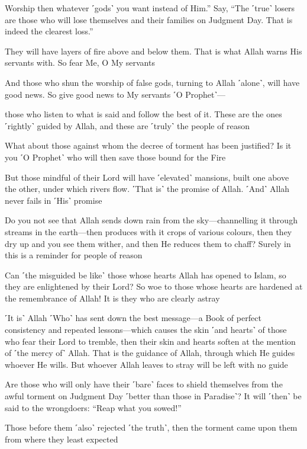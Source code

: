 Worship then whatever ˹gods˺ you want instead of Him.” Say, “The ˹true˺ losers are those who will lose themselves and their families on Judgment Day. That is indeed the clearest loss.”

They will have layers of fire above and below them. That is what Allah warns His servants with. So fear Me, O My servants

And those who shun the worship of false gods, turning to Allah ˹alone˺, will have good news. So give good news to My servants ˹O Prophet˺—

those who listen to what is said and follow the best of it. These are the ones ˹rightly˺ guided by Allah, and these are ˹truly˺ the people of reason

What about those against whom the decree of torment has been justified? Is it you ˹O Prophet˺ who will then save those bound for the Fire

But those mindful of their Lord will have ˹elevated˺ mansions, built one above the other, under which rivers flow. ˹That is˺ the promise of Allah. ˹And˺ Allah never fails in ˹His˺ promise

Do you not see that Allah sends down rain from the sky—channelling it through streams in the earth—then produces with it crops of various colours, then they dry up and you see them wither, and then He reduces them to chaff? Surely in this is a reminder for people of reason

Can ˹the misguided be like˺ those whose hearts Allah has opened to Islam, so they are enlightened by their Lord? So woe to those whose hearts are hardened at the remembrance of Allah! It is they who are clearly astray

˹It is˺ Allah ˹Who˺ has sent down the best message—a Book of perfect consistency and repeated lessons—which causes the skin ˹and hearts˺ of those who fear their Lord to tremble, then their skin and hearts soften at the mention of ˹the mercy of˺ Allah. That is the guidance of Allah, through which He guides whoever He wills. But whoever Allah leaves to stray will be left with no guide

Are those who will only have their ˹bare˺ faces to shield themselves from the awful torment on Judgment Day ˹better than those in Paradise˺? It will ˹then˺ be said to the wrongdoers: “Reap what you sowed!”

Those before them ˹also˺ rejected ˹the truth˺, then the torment came upon them from where they least expected

